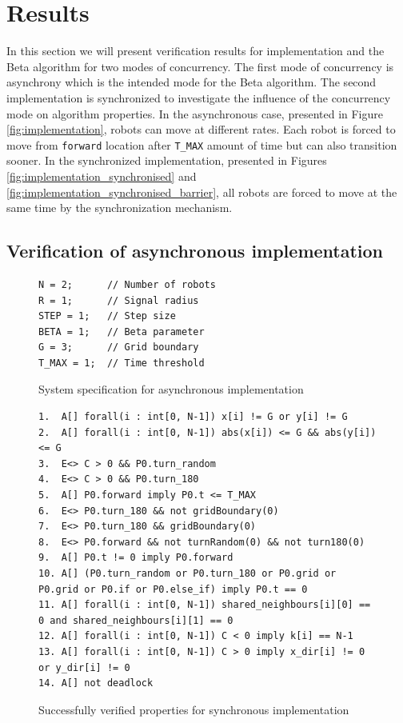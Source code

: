 \section{Results}
In this section we will present verification results for implementation and the Beta algorithm for two modes of concurrency. The first mode of concurrency is asynchrony which is the intended mode for the Beta algorithm. The second implementation is synchronized to investigate the influence of the concurrency mode on algorithm properties. In the asynchronous case, presented in Figure \ref{fig:implementation}, robots can move at different rates. Each robot is forced to move from \texttt{forward} location after \texttt{T\_MAX} amount of time but can also transition sooner. In the synchronized implementation, presented in Figures \ref{fig:implementation_synchronised} and \ref{fig:implementation_synchronised_barrier}, all robots are forced to move at the same time by the synchronization mechanism.



\subsection{Verification of asynchronous implementation}
\begin{figure}[H]
\caption{System specification for asynchronous implementation}
\label{fig:implementation_asynchronous_system}
\begin{lstlisting}[style=code]
N = 2;      // Number of robots
R = 1;      // Signal radius
STEP = 1;   // Step size
BETA = 1;   // Beta parameter
G = 3;      // Grid boundary
T_MAX = 1;  // Time threshold
\end{lstlisting}
\end{figure}

\begin{figure}[H]
\caption{Successfully verified properties for synchronous implementation}
\label{fig:implementation_asynchronous_properties}
\begin{lstlisting}[style=code]
1.  A[] forall(i : int[0, N-1]) x[i] != G or y[i] != G
2.  A[] forall(i : int[0, N-1]) abs(x[i]) <= G && abs(y[i]) <= G
3.  E<> C > 0 && P0.turn_random
4.  E<> C > 0 && P0.turn_180
5.  A[] P0.forward imply P0.t <= T_MAX
6.  E<> P0.turn_180 && not gridBoundary(0)
7.  E<> P0.turn_180 && gridBoundary(0)
8.  E<> P0.forward && not turnRandom(0) && not turn180(0)
9.  A[] P0.t != 0 imply P0.forward
10. A[] (P0.turn_random or P0.turn_180 or P0.grid or P0.grid or P0.if or P0.else_if) imply P0.t == 0
11. A[] forall(i : int[0, N-1]) shared_neighbours[i][0] == 0 and shared_neighbours[i][1] == 0
12. A[] forall(i : int[0, N-1]) C < 0 imply k[i] == N-1
13. A[] forall(i : int[0, N-1]) C > 0 imply x_dir[i] != 0 or y_dir[i] != 0
14. A[] not deadlock
\end{lstlisting}    
\end{figure}

